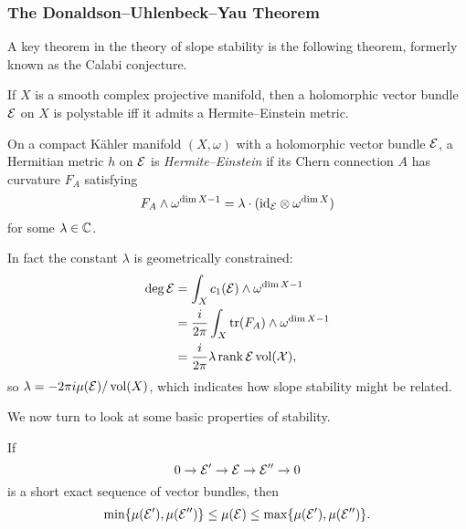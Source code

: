 \subsubsection{The Donaldson--Uhlenbeck--Yau Theorem}

A key theorem in the theory of slope stability is the following theorem,
formerly known as the Calabi conjecture.

\begin{theorem}
    If $X$ is a smooth complex projective manifold, then a holomorphic vector
    bundle $\mathcal{E}$ on $X$ is polystable iff it admits a Hermite--Einstein
    metric.
\end{theorem}

\begin{definition}
    On a compact K\"ahler manifold $(X,\omega)$ with a holomorphic vector bundle
    $\mathcal{E}$, a Hermitian metric $h$ on $\mathcal{E}$ is \emph{Hermite--Einstein} if
    its Chern connection $A$ has curvature $F_A$ satisfying
    \begin{equation*}
        F_A\wedge\omega^{\dim X-1}
            = \lambda\cdot(\mathrm{id}_{\mathcal{E}}\otimes\omega^{\dim X})
    \end{equation*}
    for some $\lambda\in\mathbb{C}$.
\end{definition}

In fact the constant $\lambda$ is geometrically constrained:
\begin{align*}
    \deg\mathcal{E}
        &= \int_Xc_1(\mathcal{E})\wedge\omega^{\dim X-1} \\
        &= \frac{i}{2\pi}\int_X\operatorname{tr}(F_A)\wedge\omega^{\dim X-1} \\
        &= \frac{i}{2\pi}\lambda\operatorname{rank}\cal E\operatorname{vol}(X),
\end{align*}
so $\lambda=-2\pi i\mu(\mathcal{E})/\operatorname{vol}(X)$, which indicates how slope stability
might be related.

We now turn to look at some basic properties of stability.

\begin{proposition}
    If
    \begin{equation*}
        0\to\mathcal{E}'\to\mathcal{E}\to\mathcal{E}''\to0
    \end{equation*}
    is a short exact sequence of vector
    bundles, then
    \begin{equation*}
        \min\{\mu(\mathcal{E}'),\mu(\mathcal{E}'')\}
            \le \mu(\mathcal{E}) \le \max\{\mu(\mathcal{E}'),\mu(\mathcal{E}'')\}.
    \end{equation*}
\end{proposition}

